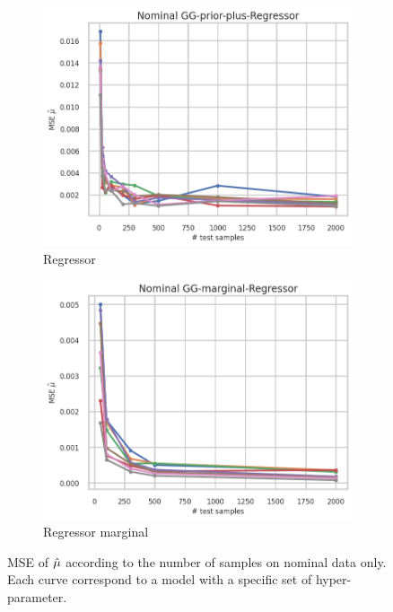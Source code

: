 \begin{figure}[ht!]
  \begin{subfigure}[t]{0.49\linewidth}
    \includegraphics[width=\linewidth]{COMPARE/GG-prior-plus/Regressor/profusion_nominal_n_samples_mse.png}
    \caption{Regressor}
  \end{subfigure}%
  \hfill
  \begin{subfigure}[t]{0.49\linewidth}
    \includegraphics[width=\linewidth]{COMPARE/GG-marginal/Regressor/profusion_nominal_n_samples_mse.png}
    \caption{Regressor marginal}
  \end{subfigure}

  \caption{MSE of $\hat\mu$ according to the number of samples on nominal data only. Each curve correspond to a model with a specific set of hyper-parameter.}
  \label{fig:gg_baseline_nominal_n_samples_mse}
\end{figure}



